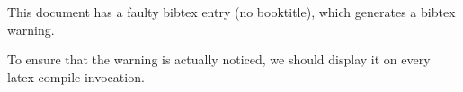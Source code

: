 \documentclass{article}
\begin{document}
\nocite{*}

This document has a faulty bibtex entry (no booktitle), which generates a bibtex warning.

To ensure that the warning is actually noticed, we should display it on every latex-compile invocation.

\printbibliography
\end{document}
